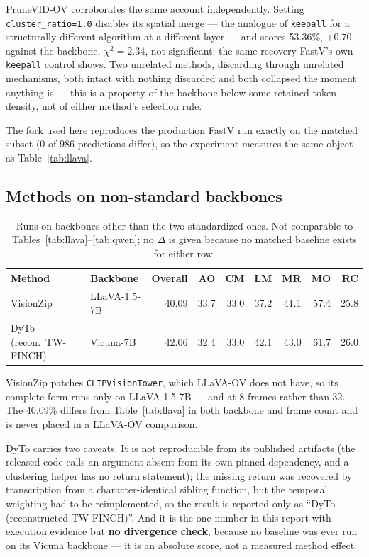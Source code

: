 \documentclass[11pt]{article}
\begin{document}
PruneVID-OV corroborates the same account independently. Setting
\texttt{cluster\_ratio=1.0} disables its spatial merge --- the analogue of
\texttt{keepall} for a structurally different algorithm at a different
layer --- and scores 53.36\%, $+0.70$ against the backbone, $\chi^2=2.34$,
not significant: the same recovery FastV's own \texttt{keepall} control
shows. Two unrelated methods, discarding through unrelated mechanisms, both
intact with nothing discarded and both collapsed the moment anything is ---
this is a property of the backbone below some retained-token density, not of
either method's selection rule.

The fork used here reproduces the production FastV run exactly on the
matched subset (0 of 986 predictions differ), so the experiment measures the
same object as Table~\ref{tab:llava}.

\subsection{Methods on non-standard backbones}
\label{sec:native}

\begin{table}[H]
  \centering
  \small
  \caption{Runs on backbones other than the two standardized ones. Not
  comparable to Tables~\ref{tab:llava}--\ref{tab:qwen}; no $\Delta$ is given
  because no matched baseline exists for either row.}
  \label{tab:native}
  \begin{tabular}{llrrrrrrr}
    \toprule
    Method & Backbone & Overall & AO & CM & LM & MR & MO & RC \\
    \midrule
    VisionZip & LLaVA-1.5-7B & 40.09 & 33.7 & 33.0 & 37.2 & 41.1 & 57.4 & 25.8 \\
    DyTo (recon.\ TW-FINCH) & Vicuna-7B & 42.06 & 32.4 & 33.0 & 42.1 & 43.0 & 61.7 & 26.0 \\
    \bottomrule
  \end{tabular}
\end{table}

VisionZip patches \texttt{CLIPVisionTower}, which LLaVA-OV does not have, so
its complete form runs only on LLaVA-1.5-7B --- and at 8 frames rather than
32. The 40.09\% differs from Table~\ref{tab:llava} in both backbone and
frame count and is never placed in a LLaVA-OV comparison.

DyTo carries two caveats. It is not reproducible from its published
artifacts (the released code calls an argument absent from its own pinned
dependency, and a clustering helper has no return statement); the missing
return was recovered by transcription from a character-identical sibling
function, but the temporal weighting had to be reimplemented, so the result
is reported only as ``DyTo (reconstructed TW-FINCH)''. And it is the one
number in this report with execution evidence but \textbf{no divergence
check}, because no baseline was ever run on its Vicuna backbone --- it is an
absolute score, not a measured method effect.
\end{document}
